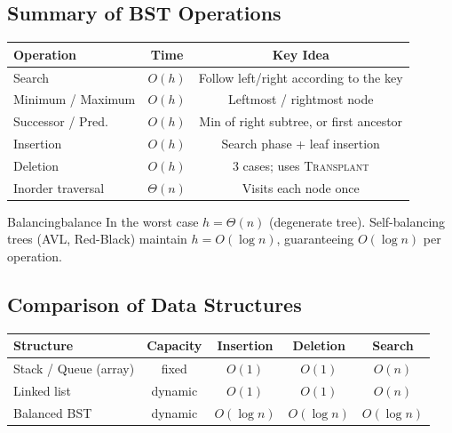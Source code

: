 \subsection{Summary of BST Operations}

\begin{center}
\renewcommand{\arraystretch}{1.35}
\begin{tabular}{lcc}
\toprule
\textbf{Operation} & \textbf{Time} & \textbf{Key Idea} \\
\midrule
Search                 & $O(h)$      & Follow left/right according to the key \\
Minimum / Maximum      & $O(h)$      & Leftmost / rightmost node \\
Successor / Pred.      & $O(h)$      & Min of right subtree, or first ancestor \\
Insertion              & $O(h)$      & Search phase + leaf insertion \\
Deletion               & $O(h)$      & 3 cases; uses \textsc{Transplant} \\
Inorder traversal      & $\Theta(n)$ & Visits each node once \\
\bottomrule
\end{tabular}
\end{center}

\begin{remark}{Balancing}{balance}
In the worst case $h = \Theta(n)$ (degenerate tree). Self-balancing trees
(AVL, Red-Black) maintain $h = O(\log n)$, guaranteeing $O(\log n)$ per operation.
\end{remark}

\subsection{Comparison of Data Structures}

\begin{center}
\renewcommand{\arraystretch}{1.4}
\begin{tabular}{lcccc}
\toprule
\textbf{Structure}   & \textbf{Capacity} & \textbf{Insertion} & \textbf{Deletion} & \textbf{Search} \\
\midrule
Stack / Queue (array)  & fixed     & $O(1)$       & $O(1)$       & $O(n)$ \\
Linked list            & dynamic   & $O(1)$     & $O(1)$       & $O(n)$ \\
Balanced BST           & dynamic   & $O(\log n)$ & $O(\log n)$ & $O(\log n)$ \\
\bottomrule
\end{tabular}
\end{center}

